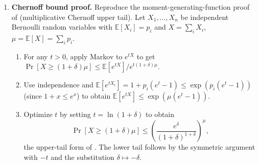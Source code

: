 \begin{enumerate}
\item \exstarstarstar
\label{ex:ch11-11}
\textbf{Chernoff bound proof.}
Reproduce the moment-generating-function proof of
 (multiplicative Chernoff upper tail). Let
$X_1, \ldots, X_n$ be independent Bernoulli random variables with
$\mathbb{E}[X_i] = p_i$ and $X = \sum_i X_i$, $\mu = \mathbb{E}[X]
= \sum_i p_i$.
\begin{enumerate}
  \item[(a)] For any $t > 0$, apply Markov to $e^{t X}$ to get
    $\Pr[X \ge (1 + \delta) \mu] \le \mathbb{E}[e^{t X}] /
    e^{t (1 + \delta) \mu}$.
  \item[(b)] Use independence and $\mathbb{E}[e^{t X_i}] = 1 +
    p_i (e^t - 1) \le \exp(p_i (e^t - 1))$ (since $1 + x \le
    e^x$) to obtain $\mathbb{E}[e^{t X}] \le \exp(\mu (e^t - 1))$.
  \item[(c)] Optimize $t$ by setting $t = \ln(1 + \delta)$ to
    obtain
    \[
      \Pr[X \ge (1 + \delta) \mu] \le \left(\frac{e^{\delta}}
        {(1 + \delta)^{1 + \delta}}\right)^{\mu},
    \]
    the upper-tail form of . The lower tail
    follows by the symmetric argument with $-t$ and the
    substitution $\delta \mapsto -\delta$.
\end{enumerate}

\end{enumerate}
